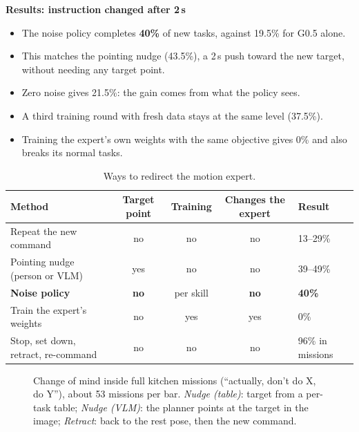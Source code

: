 \documentclass[11pt,a4paper]{article}
\newcommand{\sub}[1]{\par\needspace{4\baselineskip}\smallskip\noindent\textbf{#1}\par}
\begin{document}
\sub{Results: instruction changed after 2\,s}
\begin{itemize}
\item The noise policy completes \textbf{40\%} of new tasks, against 19.5\% for G0.5 alone.
\item This matches the pointing nudge (43.5\%), a 2\,s push toward the new target, without needing any target point.
\item Zero noise gives 21.5\%: the gain comes from what the policy sees.
\item A third training round with fresh data stays at the same level (37.5\%).
\item Training the expert's own weights with the same objective gives 0\% and also breaks its normal tasks.
\end{itemize}

\begin{table}[!htbp]\centering\small
\begin{tabularx}{\textwidth}{P{5.0cm}cccY}
\toprule
Method & Target point & Training & Changes the expert & Result \\
\midrule
Repeat the new command & no & no & no & 13--29\% \\
Pointing nudge (person or VLM) & yes & no & no & 39--49\% \\
\textbf{Noise policy} & \textbf{no} & per skill & \textbf{no} & \textbf{40\%} \\
Train the expert's weights & no & yes & yes & 0\% \\
Stop, set down, retract, re-command & no & no & no & 96\% in missions \\
\bottomrule
\end{tabularx}
\caption{Ways to redirect the motion expert.}
\end{table}

\begin{figure}[!htbp]\centering
{}
\caption{Change of mind inside full kitchen missions (``actually, don't do X, do Y''), about 53 missions per bar. \emph{Nudge (table)}: target from a per-task table; \emph{Nudge (VLM)}: the planner points at the target in the image; \emph{Retract}: back to the rest pose, then the new command.}
\label{fig:steermis}
\end{figure}
\end{document}
